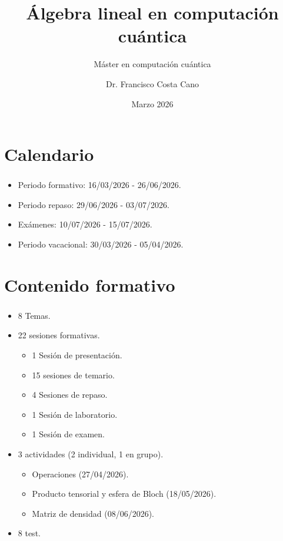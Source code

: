 \documentclass{beamer}
\title{Álgebra lineal en computación cuántica}
\subtitle{Máster en computación cuántica}
\author[F. Costa Cano]{Dr. Francisco Costa Cano}
\institute[UNIR]{Universidad Internacional de La Rioja}
\date{Marzo 2026}
\begin{document}
\portada

\section{Calendario}
\begin{frame}
  \frametitle{\insertsection}
  \begin{itemize}
    \item Periodo formativo: 16/03/2026 - 26/06/2026.\pause
    \item Periodo repaso: 29/06/2026 - 03/07/2026.\pause
    \item Exámenes: 10/07/2026 - 15/07/2026.\pause
    \item Periodo vacacional: 30/03/2026 - 05/04/2026.
  \end{itemize}
\end{frame}


\section{Contenido formativo}
\begin{frame}
  \frametitle{\insertsection}
  \begin{itemize}
    \item 8 Temas.\pause
    \item 22 sesiones formativas.\pause
          \begin{itemize}
            \item 1 Sesión de presentación.\pause
            \item 15 sesiones de temario.\pause
            \item 4 Sesiones de repaso.\pause
            \item 1 Sesión de laboratorio.\pause
            \item 1 Sesión de examen.\pause
          \end{itemize}
    \item 3 actividades (2 individual, 1 en grupo).\pause
          \begin{itemize}
            \item Operaciones (27/04/2026).
            \item Producto tensorial y esfera de Bloch (18/05/2026).
            \item Matriz de densidad (08/06/2026).
          \end{itemize}\pause
    \item 8 test.
  \end{itemize}
\end{frame}
\end{document}
